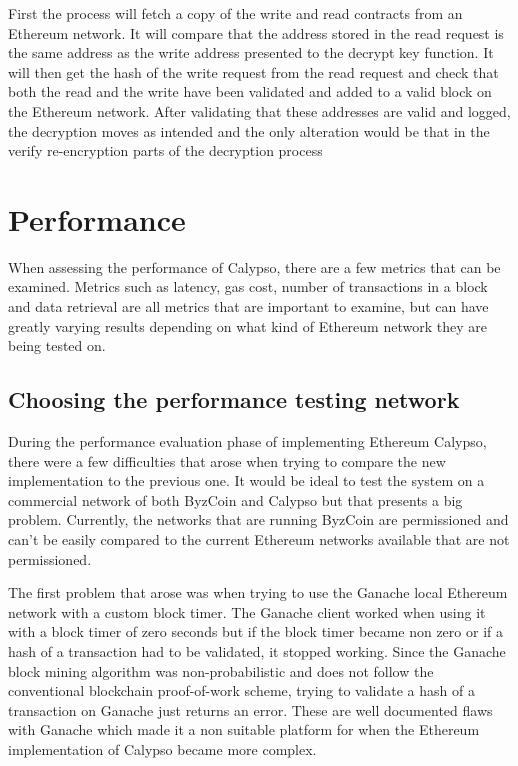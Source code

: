 \documentclass[12pt]{article}
\begin{document}
First the process will fetch a copy of the write and read contracts from an Ethereum network. It will compare that the address stored in the read request is the same address as the write address presented to the decrypt key function. It will then get the hash of the write request from the read request and check that both the read and the write have been validated and added to a valid block on the Ethereum network. After validating that these addresses are valid and logged, the decryption moves as intended and the only alteration would be that in the verify re-encryption parts of the decryption process 

\section{Performance}
When assessing the performance of Calypso, there are a few metrics that can be examined. Metrics such as latency, gas cost, number of transactions in a block and data retrieval are all metrics that are important to examine, but can have greatly varying results depending on what kind of Ethereum network they are being tested on. 

\subsection{Choosing the performance testing network}
During the performance evaluation phase of implementing Ethereum Calypso, there were a few difficulties that arose when trying to compare the new implementation to the previous one. It would be ideal to test the system on a commercial network of both ByzCoin and Calypso but that presents a big problem. Currently, the networks that are running ByzCoin are permissioned and can't be easily compared to the current Ethereum networks available that are not permissioned.

The first problem that arose was when trying to use the Ganache local Ethereum network with a custom block timer. The Ganache client worked when using it with a block timer of zero seconds but if the block timer became non zero or if a hash of a transaction had to be validated, it stopped working. Since the Ganache block mining algorithm was non-probabilistic and does not follow the conventional blockchain proof-of-work scheme, trying to validate a hash of a transaction on Ganache just returns an error. These are well documented flaws with Ganache which made it a non suitable platform for when the Ethereum implementation of Calypso became more complex.
\end{document}
